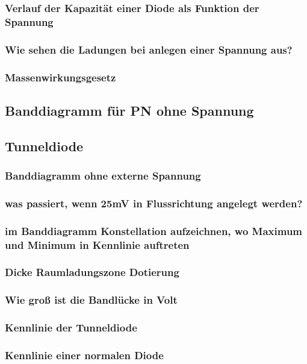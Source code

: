 \documentclass{article}
\begin{document}
    \subsubsection{Verlauf der Kapazit\"at einer Diode als Funktion der Spannung}
    \subsubsection{Wie sehen die Ladungen bei anlegen einer Spannung aus?}
    \subsubsection{Massenwirkungsgesetz}

\subsection{Banddiagramm für PN ohne Spannung}\label{k5:pnBand}
\subsection{Tunneldiode}\label{k5:tunnelDiode}
    \subsubsection{Banddiagramm ohne externe Spannung}
    \subsubsection{was passiert, wenn 25mV in Flussrichtung angelegt werden?}
    \subsubsection{im Banddiagramm Konstellation aufzeichnen, wo Maximum und Minimum in Kennlinie auftreten}
    
    \subsubsection{Dicke Raumladungszone Dotierung}
    \subsubsection{Wie groß ist die Bandlücke in Volt}
    \subsubsection{Kennlinie der Tunneldiode}
    \subsubsection{Kennlinie einer normalen Diode}
    
\end{document}

